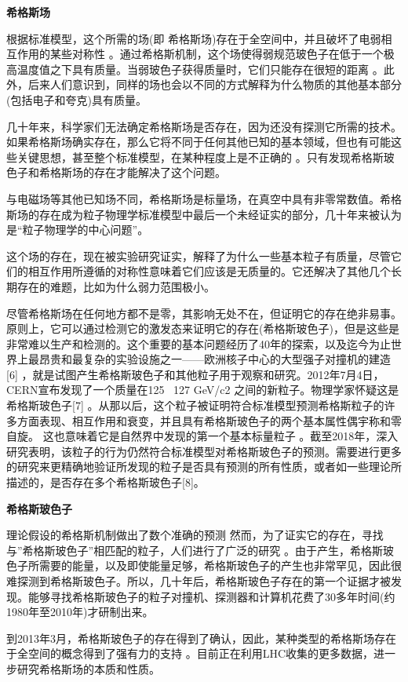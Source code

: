 \textbf{希格斯场}

根据标准模型，这个所需的场(即 希格斯场)存在于全空间中，并且破坏了电弱相互作用的某些对称性 。通过希格斯机制，这个场使得弱规范玻色子在低于一个极高温度值之下具有质量。当弱玻色子获得质量时，它们只能存在很短的距离 。此外，后来人们意识到，同样的场也会以不同的方式解释为什么物质的其他基本部分(包括电子和夸克)具有质量。

几十年来，科学家们无法确定希格斯场是否存在，因为还没有探测它所需的技术。如果希格斯场确实存在，那么它将不同于任何其他已知的基本领域，但也有可能这些关键思想，甚至整个标准模型，在某种程度上是不正确的 。只有发现希格斯玻色子和希格斯场的存在才能解决了这个问题。

与电磁场等其他已知场不同，希格斯场是标量场，在真空中具有非零常数值。希格斯场的存在成为粒子物理学标准模型中最后一个未经证实的部分，几十年来被认为是“粒子物理学的中心问题”。

这个场的存在，现在被实验研究证实，解释了为什么一些基本粒子有质量，尽管它们的相互作用所遵循的对称性意味着它们应该是无质量的。它还解决了其他几个长期存在的难题，比如为什么弱力范围极小。

尽管希格斯场在任何地方都不是零，其影响无处不在，但证明它的存在绝非易事。原则上，它可以通过检测它的激发态来证明它的存在(希格斯玻色子)，但是这些是非常难以生产和检测的。这个重要的基本问题经历了40年的探索，以及迄今为止世界上最昂贵和最复杂的实验设施之一——欧洲核子中心的大型强子对撞机的建造[6] ，就是试图产生希格斯玻色子和其他粒子用于观察和研究。2012年7月4日，CERN宣布发现了一个质量在125~ 127 GeV/c2 之间的新粒子。物理学家怀疑这是希格斯玻色子[7] 。从那以后，这个粒子被证明符合标准模型预测希格斯粒子的许多方面表现、相互作用和衰变，并且具有希格斯玻色子的两个基本属性偶宇称和零自旋。 这也意味着它是自然界中发现的第一个基本标量粒子 。截至2018年，深入研究表明，该粒子的行为仍然符合标准模型对希格斯玻色子的预测。需要进行更多的研究来更精确地验证所发现的粒子是否具有预测的所有性质，或者如一些理论所描述的，是否存在多个希格斯玻色子[8]。

\textbf{希格斯玻色子}

理论假设的希格斯机制做出了数个准确的预测 然而，为了证实它的存在，寻找与”希格斯玻色子”相匹配的粒子，人们进行了广泛的研究 。由于产生，希格斯玻色子所需要的能量，以及即使能量足够，希格斯玻色子的产生也非常罕见，因此很难探测到希格斯玻色子。所以，几十年后，希格斯玻色子存在的第一个证据才被发现。能够寻找希格斯玻色子的粒子对撞机、探测器和计算机花费了30多年时间(约1980年至2010年)才研制出来。

到2013年3月，希格斯玻色子的存在得到了确认，因此，某种类型的希格斯场存在于全空间的概念得到了强有力的支持 。目前正在利用LHC收集的更多数据，进一步研究希格斯场的本质和性质。

